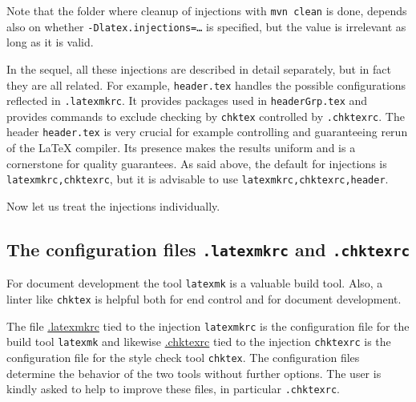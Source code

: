 Note that the folder where cleanup of injections with \texttt{mvn clean} is done, 
depends also on whether \texttt{-Dlatex.injections=\dots} is specified, 
but the value is irrelevant as long as it is valid. 

In the sequel, all these injections are described in detail separately, 
but in fact they are all related. 
For example, \texttt{header.tex} handles the possible configurations 
reflected in \texttt{.latexmkrc}. 
It provides packages used in \texttt{headerGrp.tex} 
and provides commands to exclude checking by \texttt{chktex} 
controlled by \texttt{.chktexrc}. 
The header \texttt{header.tex} is very crucial 
for example controlling and guaranteeing rerun of the \LaTeX{} compiler. 
Its presence makes the results uniform and is a cornerstone for quality guarantees. 
As said above, the default for injections is \texttt{latexmkrc,chktexrc}, 
but it is advisable to use \texttt{latexmkrc,chktexrc,header}. 





Now let us treat the injections individually. 



\subsection{The configuration files \texttt{.latexmkrc} and \texttt{.chktexrc}}\label{subsec:latChkRc}

For document development the tool \texttt{latexmk} is a valuable build tool. 
Also, a linter like \texttt{chktex} is helpful 
both for end control and for document development. 

The file \href{\urlSite fromTex/.latexmkrc}{.latexmkrc} tied to the injection \texttt{latexmkrc} 
is the configuration file for the build tool \texttt{latexmk} 
and likewise \href{\urlSite fromTex/.chktexrc}{.chktexrc} tied to the injection \texttt{chktexrc} 
is the configuration file for the style check tool \texttt{chktex}. 
The configuration files determine the behavior of the two tools without further options. 
The user is kindly asked to help to improve these files, in particular \texttt{.chktexrc}. 


